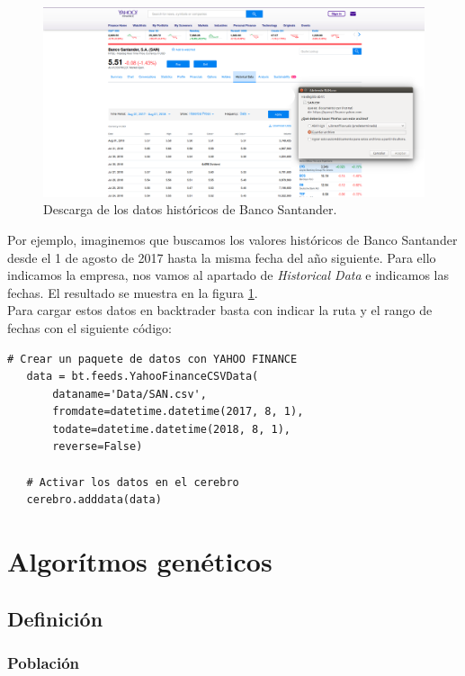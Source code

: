 \documentclass[12pt,a4paper]{article}
\begin{document}
		\begin{figure}[H]
			\centering
			\includegraphics[scale=1]{imagenes/yahoo_finance.png}
			\caption{Descarga de los datos hist\'oricos de Banco Santander.}
			\label{fig:yahoo_finance}
		\end{figure}
				
		Por ejemplo, imaginemos que buscamos los valores hist\'oricos de Banco Santander desde el 1 de agosto de 2017 hasta la misma fecha del a\~{n}o siguiente. Para ello indicamos la empresa, nos vamos al apartado de \textit{Historical Data} e indicamos las fechas. El resultado se muestra en la figura \ref{fig:yahoo_finance}.\\
		
		Para cargar estos datos en backtrader basta con indicar la ruta y el rango de fechas con el siguiente c\'odigo:

		\begin{lstlisting}[basicstyle=\tiny]
   # Crear un paquete de datos con YAHOO FINANCE
   data = bt.feeds.YahooFinanceCSVData(
	   dataname='Data/SAN.csv',
	   fromdate=datetime.datetime(2017, 8, 1),
	   todate=datetime.datetime(2018, 8, 1),
	   reverse=False)
   
   # Activar los datos en el cerebro
   cerebro.adddata(data)
		\end{lstlisting}		
		
	\newpage	
	\section{Algor\'itmos gen\'eticos}
	
		\subsection{Definici\'on}
			\subsubsection{Poblaci\'on}
\end{document}
